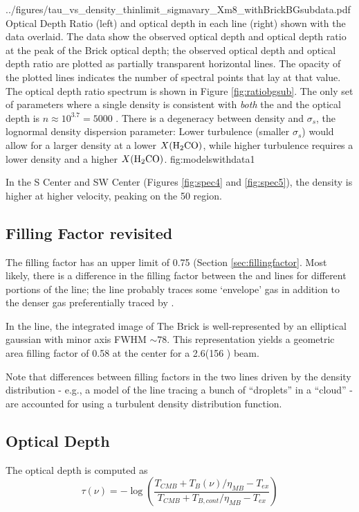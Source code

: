           {../figures/tau_vs_density_thinlimit_sigmavary_Xm8_withBrickBGsubdata.pdf}
{Optical Depth Ratio (left) and optical depth in each line (right) shown with the
data overlaid.  The data show the observed optical depth and optical depth ratio
at the peak of the Brick \oneone optical depth; the observed optical depth and
optical depth ratio are plotted as partially transparent horizontal lines.  The
opacity of the plotted lines indicates the number of spectral points that lay
at that value.  The optical depth ratio spectrum is shown in Figure
\ref{fig:ratiobgsub}.  The only set of parameters where a single density is
consistent with \emph{both} the \oneone and the \twotwo optical depth is
$n\approx10^{3.7} = 5000$ \percc.  There is a degeneracy between density and
$\sigma_s$, the lognormal density dispersion parameter: Lower turbulence
(smaller $\sigma_s$) would allow for a larger density at a lower
$X(\textrm{H}_2\textrm{CO})$, while higher turbulence requires a lower density and a
higher $X(\textrm{H}_2\textrm{CO})$.
}
{fig:modelswithdata}{1}


In the S Center and SW Center (Figures \ref{fig:spec4} and \ref{fig:spec5}),
the density is higher at higher velocity, peaking on the 50 \kms region.

\subsection{Filling Factor revisited}
The filling factor has an upper limit of 0.75 (Section \ref{sec:fillingfactor}.
Most likely, there is a difference in the filling factor between the \oneone
and \twotwo lines for different portions of the line; the \oneone line probably
traces some `envelope' gas in addition to the denser gas preferentially traced
by \twotwo.  

In the \twotwo line, the integrated image of The Brick is well-represented by
an elliptical gaussian with minor axis FWHM $\sim78$\arcsec.  This
representation yields a geometric area filling factor of 0.58 at the center for
a 2.6\arcmin (156 \arcsec) beam.

Note that differences between filling factors in the two lines driven by the
density distribution - e.g., a model of the \twotwo line tracing a bunch of
``droplets'' in a \oneone ``cloud'' - are accounted for using a turbulent
density distribution function.

\subsection{Optical Depth}
\label{sec:opticaldepth}
The optical depth is computed as 
$$\tau(\nu) = -\log\left( \frac{T_{CMB}+T_{B}(\nu)/\eta_{MB}- T_{ex}}{T_{CMB}+T_{B,cont}/\eta_{MB} - T_{ex}}\right)$$

